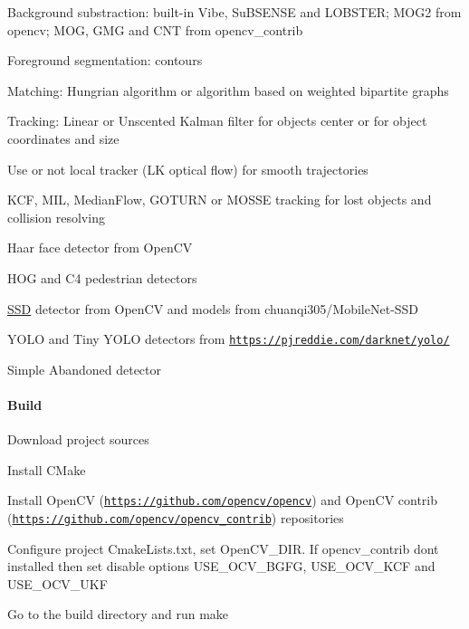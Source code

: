\begin{DoxyEnumerate}
\item Background substraction\+: built-\/in Vibe, Su\+B\+S\+E\+N\+SE and L\+O\+B\+S\+T\+ER; M\+O\+G2 from opencv; M\+OG, G\+MG and C\+NT from opencv\+\_\+contrib
\item Foreground segmentation\+: contours
\item Matching\+: Hungrian algorithm or algorithm based on weighted bipartite graphs
\item Tracking\+: Linear or Unscented Kalman filter for objects center or for object coordinates and size
\item Use or not local tracker (LK optical flow) for smooth trajectories
\item K\+CF, M\+IL, Median\+Flow, G\+O\+T\+U\+RN or M\+O\+S\+SE tracking for lost objects and collision resolving
\item Haar face detector from Open\+CV
\item H\+OG and C4 pedestrian detectors
\item \mbox{\hyperlink{class_s_s_d}{S\+SD}} detector from Open\+CV and models from chuanqi305/\+Mobile\+Net-\/\+S\+SD
\item Y\+O\+LO and Tiny Y\+O\+LO detectors from \href{https://pjreddie.com/darknet/yolo/}{\tt https\+://pjreddie.\+com/darknet/yolo/}
\item Simple Abandoned detector
\end{DoxyEnumerate}

\paragraph*{Build}


\begin{DoxyEnumerate}
\item Download project sources
\item Install C\+Make
\item Install Open\+CV (\href{https://github.com/opencv/opencv}{\tt https\+://github.\+com/opencv/opencv}) and Open\+CV contrib (\href{https://github.com/opencv/opencv_contrib}{\tt https\+://github.\+com/opencv/opencv\+\_\+contrib}) repositories
\item Configure project Cmake\+Lists.\+txt, set Open\+C\+V\+\_\+\+D\+IR. If opencv\+\_\+contrib don\textquotesingle{}t installed then set disable options U\+S\+E\+\_\+\+O\+C\+V\+\_\+\+B\+G\+FG, U\+S\+E\+\_\+\+O\+C\+V\+\_\+\+K\+CF and U\+S\+E\+\_\+\+O\+C\+V\+\_\+\+U\+KF
\item Go to the build directory and run make
\end{DoxyEnumerate}


